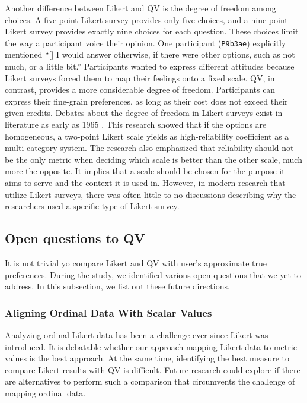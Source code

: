 Another difference between Likert and QV is the degree of freedom among choices. A five-point Likert survey provides only five choices, and a nine-point Likert survey provides exactly nine choices for each question. These choices limit the way a participant voice their opinion. One participant (\texttt{P9b3ae}) explicitly mentioned ``[\textellipsis] I would answer otherwise, if there were other options, such as not much, or a little bit.'' Participants wanted to express different attitudes because Likert surveys forced them to map their feelings onto a fixed scale. QV, in contrast, provides a more considerable degree of freedom. Participants can express their fine-grain preferences, as long as their cost does not exceed their given credits. 
Debates about the degree of freedom in Likert surveys exist in literature as early as 1965 \cite{komorita1965number}. This research showed that if the options are homogeneous, a two-point Likert scale yields as high-reliability coefficient as a multi-category system. The research also emphasized that reliability should not be the only metric when deciding which scale is better than the other scale, much more the opposite. It implies that a scale should be chosen for the purpose it aims to serve and the context it is used in. However, in modern research that utilize Likert surveys, there was often little to no discussions describing why the researchers used a specific type of Likert survey. 



\subsection{Open questions to QV}
It is not trivial yo compare Likert and QV with user's approximate true preferences. During the study, we identified various open questions that we yet to address. In this subsection, we list out these future directions.

\subsubsection{Aligning Ordinal Data With Scalar Values}
Analyzing ordinal Likert data has been a challenge ever since Likert was introduced. It is debatable whether our approach mapping Likert data to metric values is the best approach. At the same time, identifying the best measure to compare Likert results with QV is difficult. Future research could explore if there are alternatives to perform such a comparison that circumvents the challenge of mapping ordinal data. 

